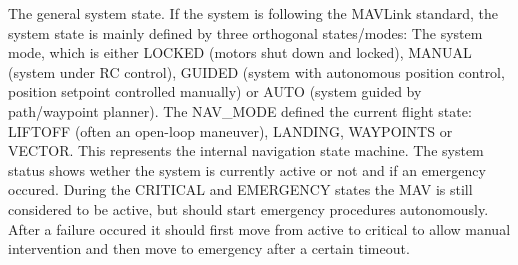 \begin{DoxyVerb}
\begin{DoxyVerb}
\begin{DoxyVerb}
\begin{DoxyVerb}
\begin{DoxyVerb}
\begin{DoxyVerb}
\begin{DoxyVerb}
\begin{DoxyVerb}
\begin{DoxyVerb}
\begin{DoxyVerb}
\begin{DoxyVerb}The general system state. If the system is following the MAVLink
standard, the system state is mainly defined by three
orthogonal states/modes: The system mode, which is
either LOCKED (motors shut down and locked), MANUAL
(system under RC control), GUIDED (system with
autonomous position control, position setpoint
controlled manually) or AUTO (system guided by
path/waypoint planner). The NAV_MODE defined the
current flight state: LIFTOFF (often an open-loop
maneuver), LANDING, WAYPOINTS or VECTOR. This
represents the internal navigation state machine. The
system status shows wether the system is currently
active or not and if an emergency occured. During the
CRITICAL and EMERGENCY states the MAV is still
considered to be active, but should start emergency
procedures autonomously. After a failure occured it
should first move from active to critical to allow
manual intervention and then move to emergency after a
certain timeout.


\end{DoxyVerb}
\end{DoxyVerb}
\end{DoxyVerb}
\end{DoxyVerb}
\end{DoxyVerb}
\end{DoxyVerb}
\end{DoxyVerb}
\end{DoxyVerb}
\end{DoxyVerb}
\end{DoxyVerb}
\end{DoxyVerb}
